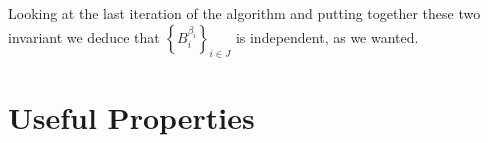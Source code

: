 \documentclass{article}
\begin{document}
\begin{exercise}
	Looking at the last iteration of the algorithm and putting together these two invariant we deduce that $\left\{B_i^{\beta_i}\right\}_{i \in J}$ is independent, as we wanted.



\end{exercise}

\bigbreak

\section*{Useful Properties}
\end{document}
